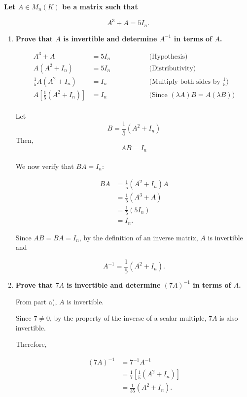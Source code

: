 
\item \textbf{Let $A\in M_n(K)$ be a matrix such that}

$$
A^3+A=5I_n.
$$

\begin{enumerate}[label=\alph*)]

    \item \textbf{Prove that $A$ is invertible
    and determine $A^{-1}$ in terms of $A$.}

    \begin{answer}
        
        $$
        \begin{alignedat}{2}
        A^3+A
            &=5I_n
            &\qquad\qquad& \text{(Hypothesis)}\\
        A(A^2+I_n)
            &=5I_n
            && \text{(Distributivity)}\\
        \frac{1}{5} A(A^2+I_n)
            &=I_n
            && \text{(Multiply both sides by $\frac{1}{5}$)}\\
        A\left[\frac{1}{5}(A^2+I_n)\right]
            &=I_n
            && \text{(Since $(\lambda A)B=A(\lambda B)$)}
        \end{alignedat}
        $$ \\

        Let $$B=\frac15(A^2+I_n)$$
        Then, $$\boxed{AB=I_n}$$  \\[0.5em]
        
        We now verify that $BA=I_n$:

        $$
        \begin{aligned}
        BA
        &=\frac15(A^2+I_n)A\\
        &=\frac15(A^3+A)\\
        &=\frac15(5I_n)\\
        &=I_n.
        \end{aligned}
        $$

        Since $AB=BA=I_n$, by the
        definition of an inverse matrix,
        $A$ is invertible and

        $$
        \boxed{
        A^{-1}=\frac15(A^2+I_n)
        }.
        $$
    \end{answer}

    \item \textbf{Prove that $7A$ is invertible
    and determine $(7A)^{-1}$ in terms of $A$.}

    \begin{answer}
        From part a), $A$ is invertible.

        Since $7\neq0$, by the property
        of the inverse of a scalar multiple,
        $7A$ is also invertible.

        Therefore,

        $$
        \begin{aligned}
        (7A)^{-1}
        &=7^{-1}A^{-1}\\
        &=\frac17\left[\frac15(A^2+I_n)\right]\\
        &=\boxed{\frac1{35}(A^2+I_n)}.
        \end{aligned}
        $$
    \end{answer}

\end{enumerate}
